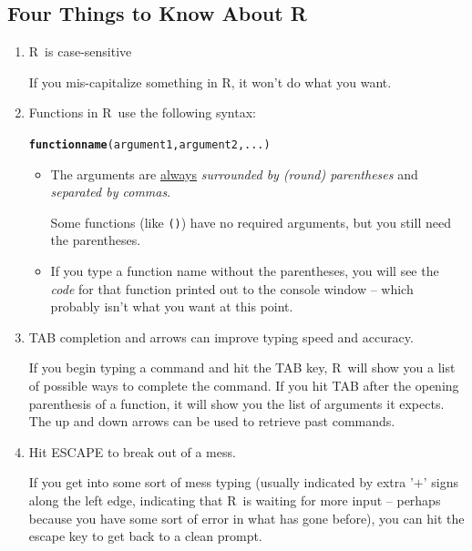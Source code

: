 \documentclass[twoside]{book}\usepackage[]{graphicx}\usepackage[]{xcolor}
\makeatletter
\newcommand{\hlstd}[1]{\textcolor[rgb]{0.345,0.345,0.345}{#1}}%
\newcommand{\hlkwd}[1]{\textcolor[rgb]{0.737,0.353,0.396}{\textbf{#1}}}%
\newenvironment{kframe}{%
 \def\at@end@of@kframe{}%
 \ifinner\ifhmode%
  \def\at@end@of@kframe{\end{minipage}}%
  \begin{minipage}{\columnwidth}%
 \fi\fi%
 \def\FrameCommand##1{\hskip\@totalleftmargin \hskip-\fboxsep
 \colorbox{shadecolor}{##1}\hskip-\fboxsep
     \hskip-\linewidth \hskip-\@totalleftmargin \hskip\columnwidth}%
 \MakeFramed {\advance\hsize-\width
   \@totalleftmargin\z@ \linewidth\hsize
   \@setminipage}}%
 {\par\unskip\endMakeFramed%
 \at@end@of@kframe}
\newenvironment{knitrout}{}{} %
\newcommand{\Rindex}[1]{\index{\texttt{#1}}}
\newcommand{\function}[1]{{\color{purple!75!blue}\texttt{\StrSubstitute{#1}{()}{}()}}\Rindex{#1}}
\def\R{{\sf R}}
\makeatother
\begin{document}
\subsection{Four Things to Know About \R}
\begin{enumerate}
\item \R\ is case-sensitive

If you mis-capitalize something in \R, it won't do what you want.

\item 
Functions in \R\ use the following syntax:
\begin{knitrout}
\color{fgcolor}\begin{kframe}
\begin{alltt}
\hlkwd{functionname}\hlstd{(argument1, argument2, ...)}
\end{alltt}
\end{kframe}
\end{knitrout}
\vspace{-5mm}
\begin{itemize}
\item The arguments are \underline{always} \emph{surrounded by (round) parentheses} and 
\emph{separated by commas}.

Some functions (like \function{data()}) 
have no required arguments, but you still need the parentheses.

\item
If you type a function name without the parentheses, you will see the \emph{code} for that
function printed out to the console window -- which probably isn't what you want at this point.
\end{itemize}
\item
TAB completion and arrows can improve typing speed and accuracy.

If you begin typing a command and hit the TAB key, \R\ will show you a list of
possible ways to complete the command.  If you hit TAB after the opening
parenthesis of a function, it will show you the list of arguments it expects.
The up and down arrows can be used to retrieve past commands.
\item Hit ESCAPE to break out of a mess.
	
	If you get into some sort of mess typing (usually indicated by extra '$+$' 
	signs along the left edge, indicating that \R\ is waiting for more 
	input -- perhaps because you have some sort of error in what has gone before), 
	you can hit the escape key to get back to a clean prompt.
\end{enumerate}
\end{document}
